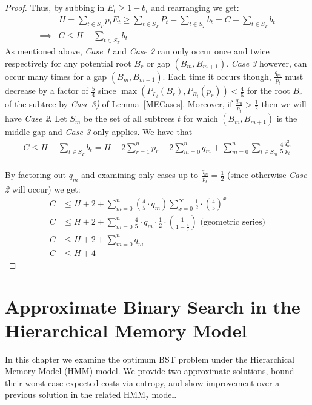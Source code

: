 \documentclass[]{beamer}
\theoremstyle{plain}
\begin{document}
\begin{frame}
\begin{proof}
\noindent Thus, by subbing in $E_t \geq 1 - b_t$ and rearranging we get: 
\begin{align*}
&H = \sum_{t \in S_T} p_t E_t \geq \sum_{t \in S_T} P_t - \sum_{t \in S_T} b_t = C - \sum_{t \in S_T} b_t \\
 \implies &C \leq H + \sum_{t \in S_T} b_t
\end{align*}
As mentioned above, \textit{Case 1} and \textit{Case 2} can only occur once and twice respectively for any potential root $B_r$ or gap $(B_m, B_{m+1})$. \textit{Case 3} however, can occur many times for a gap $(B_m, B_{m+1})$. Each time it occurs though, $\frac{q_m}{p_t}$ must decrease by a factor of $\frac{5}{4}$ since $\max(P_{L_t}(B_r), P_{R_t}(p_r)) < \frac{4}{5}$ for the root $B_r$ of the subtree by \textit{Case 3)} of Lemma~\ref{MECases}. Moreover, if $\frac{q_m}{p_t} > \frac{1}{2}$ then we will have \textit{Case 2}. Let $S_m$ be the set of all subtrees $t$ for which $(B_m, B_{m+1})$ is the middle gap and \textit{Case 3} only applies. We have that
\begin{align*}
C \leq H + \sum_{t \in S_T} b_t = H + 2 \sum\limits_{r = 1}^n p_r + 2 \sum\limits_{m = 0}^n q_m + \sum\limits_{m = 0}^n \sum\limits_{t \in S_m} \frac{4}{5}\frac{q_m^2}{p_t}
\end{align*}
 \\ 
By factoring out $q_m$ and examining only cases up to $\frac{q_m}{p_t} = \frac{1}{2}$ (since otherwise \textit{Case 2} will occur) we get:
\begin{align*}
C &\leq H + 2 + \sum\limits_{m = 0}^n (\frac{4}{5} \cdot q_m) \sum\limits_{x=0}^{\infty} \frac{1}{2} \cdot (\frac{4}{5}) ^ x \\
C &\leq H + 2 + \sum\limits_{m = 0}^n \frac{4}{5} \cdot q_m \cdot \frac{1}{2} \cdot (\frac{1}{1-\frac{4}{5}}) \text{    (geometric series)} \\
C &\leq H + 2 + \sum\limits_{m = 0}^n q_m \\
C &\leq H + 4
\end{align*}

\end{proof}
\end{frame}

\section{Approximate Binary Search in the Hierarchical Memory Model}\label{Approximate Binary Search in the Hierarchical Memory Model}
 \begin{frame}
In this chapter we examine the optimum BST problem under the Hierarchical Memory Model (HMM) model. We provide two approximate solutions, bound their worst case expected costs via entropy, and show improvement over a previous solution in the related HMM$_2$ model. 
\end{frame} 
 
\end{document}
